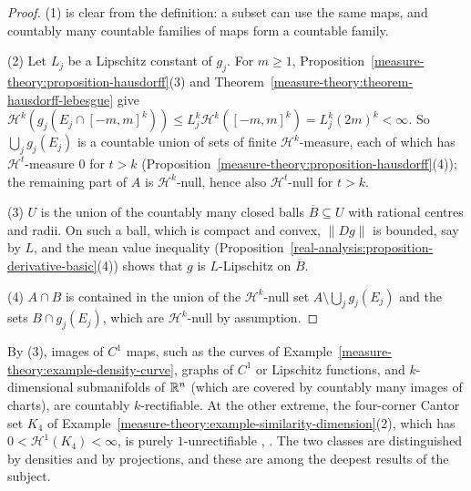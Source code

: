 \begin{proof}
(1) is clear from the definition: a subset can use the same maps, and countably many countable families of maps form a countable family.

(2) Let $L_j$ be a Lipschitz constant of $g_j$. For $m \geq 1$, Proposition~\ref{measure-theory:proposition-hausdorff}(3) and Theorem~\ref{measure-theory:theorem-hausdorff-lebesgue} give
$\mathcal{H}^k(g_j(E_j \cap [-m, m]^k)) \leq L_j^k\mathcal{H}^k([-m, m]^k) = L_j^k(2m)^k < \infty$. So $\bigcup_jg_j(E_j)$ is a countable union of sets of finite $\mathcal{H}^k$-measure, each of which has
$\mathcal{H}^t$-measure $0$ for $t > k$ (Proposition~\ref{measure-theory:proposition-hausdorff}(4)); the remaining part of $A$ is $\mathcal{H}^k$-null, hence also $\mathcal{H}^t$-null for $t > k$.

(3) $U$ is the union of the countably many closed balls $\overline{B} \subseteq U$ with rational centres and radii. On such a ball, which is compact and convex, $\|Dg\|$ is bounded, say by $L$, and the mean
value inequality (Proposition~\ref{real-analysis:proposition-derivative-basic}(4)) shows that $g$ is $L$-Lipschitz on $\overline{B}$.

(4) $A \cap B$ is contained in the union of the $\mathcal{H}^k$-null set $A \setminus \bigcup_jg_j(E_j)$ and the sets $B \cap g_j(E_j)$, which are $\mathcal{H}^k$-null by assumption.
\end{proof}

By (3), images of $C^1$ maps, such as the curves of Example~\ref{measure-theory:example-density-curve}, graphs of $C^1$ or Lipschitz functions, and $k$-dimensional submanifolds of $\mathbb{R}^n$ (which are
covered by countably many images of charts), are countably $k$-rectifiable. At the other extreme, the four-corner Cantor set $K_4$ of Example~\ref{measure-theory:example-similarity-dimension}(2), which has
$0 < \mathcal{H}^1(K_4) < \infty$, is purely $1$-unrectifiable \cite{falconer-gofs}, \cite{mattila-1995}. The two classes are distinguished by densities and by projections, and these are among the
deepest results of the subject.

